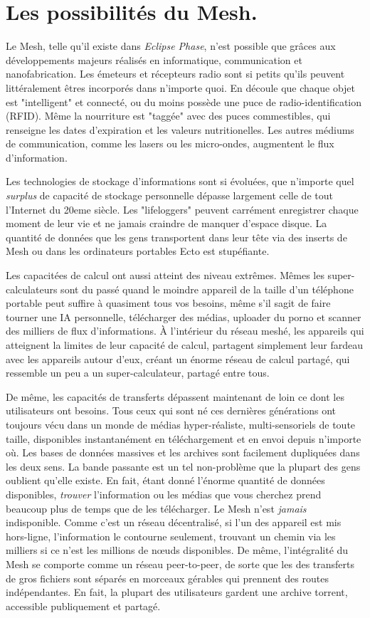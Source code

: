 \section{Les possibilités du Mesh.} 

Le Mesh, telle qu'il existe dans \textit{Eclipse Phase}, n'est possible que grâces aux développements majeurs réalisés en informatique, communication et nanofabrication. Les émeteurs et récepteurs radio sont si petits qu'ils peuvent littéralement êtres incorporés dans n'importe quoi. En découle que chaque objet est "intelligent" et connecté, ou du moins possède une puce de radio-identification (RFID). Même la nourriture est "taggée" avec des puces commestibles, qui renseigne les dates d'expiration et les valeurs nutritionelles. Les autres médiums de communication, comme les lasers ou les micro-ondes, augmentent le flux d'information. 

Les technologies de stockage d'informations sont si évoluées, que n'importe quel \textit{surplus} de capacité de stockage personnelle dépasse largement celle de tout l'Internet du 20eme siècle. Les "lifeloggers" peuvent carrément enregistrer chaque moment de leur vie et ne jamais craindre de manquer d'espace disque. La quantité de données que les gens transportent dans leur tête via des inserts de Mesh ou dans les ordinateurs portables Ecto est stupéfiante. 

Les capacitées de calcul ont aussi atteint des niveau extrêmes. Mêmes les super-calculateurs sont du passé quand le moindre appareil de la taille d'un téléphone portable peut suffire à quasiment tous vos besoins, même s'il sagit de faire tourner une IA personnelle, télécharger des médias, uploader du porno et scanner des milliers de flux d'informations. À l'intérieur du réseau meshé, les appareils qui atteignent la limites de leur capacité de calcul, partagent simplement leur fardeau avec les appareils autour d'eux, créant un énorme réseau de calcul partagé, qui ressemble un peu a un super-calculateur, partagé entre tous. 

De même, les capacités de transferts dépassent maintenant de loin ce dont les utilisateurs ont besoins. Tous ceux qui sont né ces dernières générations ont toujours vécu dans un monde de médias hyper-réaliste, multi-sensoriels de toute taille, disponibles instantanément en téléchargement et en envoi depuis n'importe où. Les bases de données massives et les archives sont facilement dupliquées dans les deux sens. La bande passante est un tel non-problème que la plupart des gens oublient qu'elle existe. En fait, étant donné l'énorme quantité de données disponibles, \textit{trouver} l'information ou les médias que vous cherchez prend beaucoup plus de temps que de les télécharger. Le Mesh n'est \textit{jamais } indisponible. Comme c'est un réseau décentralisé, si l'un des appareil est mis hors-ligne, l'information le contourne seulement, trouvant un chemin via les milliers si ce n'est les millions de nœuds disponibles. De même, l'intégralité du Mesh se comporte comme un réseau peer-to-peer, de sorte que les des transferts de gros fichiers sont séparés en morceaux gérables qui prennent des routes indépendantes. En fait, la plupart des utilisateurs gardent une archive torrent, accessible publiquement et partagé.  

